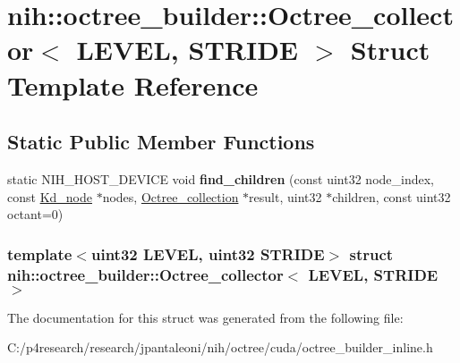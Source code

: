 \hypertarget{structnih_1_1octree__builder_1_1_octree__collector}{
\section{nih\-:\-:octree\-\_\-builder\-:\-:\-Octree\-\_\-collector$<$ \-L\-E\-V\-E\-L, \-S\-T\-R\-I\-D\-E $>$ \-Struct \-Template \-Reference}
\label{structnih_1_1octree__builder_1_1_octree__collector}
}
\subsection*{\-Static \-Public \-Member \-Functions}
\begin{DoxyCompactItemize}
\item 
\hypertarget{structnih_1_1octree__builder_1_1_octree__collector_a625b435a5d84e54bd6a9a5dcd83cd297}{
static \-N\-I\-H\-\_\-\-H\-O\-S\-T\-\_\-\-D\-E\-V\-I\-C\-E void {\bfseries find\-\_\-children} (const uint32 node\-\_\-index, const \hyperlink{structnih_1_1_bintree__node}{\-Kd\-\_\-node} $\ast$nodes, \hyperlink{structnih_1_1octree__builder_1_1_octree__collection}{\-Octree\-\_\-collection} $\ast$result, uint32 $\ast$children, const uint32 octant=0)}
\label{structnih_1_1octree__builder_1_1_octree__collector_a625b435a5d84e54bd6a9a5dcd83cd297}

\end{DoxyCompactItemize}
\subsubsection*{template$<$uint32 \-L\-E\-V\-E\-L, uint32 \-S\-T\-R\-I\-D\-E$>$ struct nih\-::octree\-\_\-builder\-::\-Octree\-\_\-collector$<$ L\-E\-V\-E\-L, S\-T\-R\-I\-D\-E $>$}



\-The documentation for this struct was generated from the following file\-:\begin{DoxyCompactItemize}
\item 
\-C\-:/p4research/research/jpantaleoni/nih/octree/cuda/octree\-\_\-builder\-\_\-inline.\-h\end{DoxyCompactItemize}
